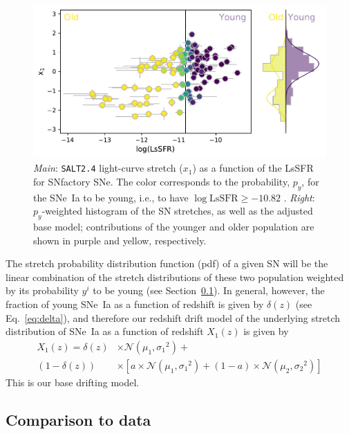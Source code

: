 \documentclass[]{aa}
\begin{document}
\begin{figure}
    \centering
    \includegraphics[width=0.8\linewidth]{Article_figures/model_base_hist.pdf}
    \caption{\textit{Main}: \textsc{\texttt{SALT2.4}} light-curve stretch
        ($x_1$) as a function of the LsSFR for SNfactory SNe. The color
        corresponds to the probability, $p_y$, for the SNe~Ia to be young, i.e.,
        to have $\log\mathrm{LsSFR} \geq -10.82$ \citep[see][]{rigault2020}.
    \textit{Right}: $p_y$-weighted histogram of the SN stretches, as well as the
adjusted base model; contributions of the younger and older population are shown
in purple and yellow, respectively.}
    \label{fig:stretchlssfr}
\end{figure}

The stretch probability distribution function (pdf) of a given SN will be the
linear combination of the stretch distributions of these two population weighted
by its probability $y^i$ to be young (see Section~\ref{sec:basemodelapplied}).
In general, however, the fraction of young SNe~Ia as a function of redshift is
given by $\delta(z)$ (see Eq.~\ref{eq:delta}), and therefore our redshift drift
model of the underlying stretch distribution of SNe~Ia as a function of redshift
$X_1(z)$ is given by
\begin{align}\label{eq:stretchz}
    X_1(z) = \delta(z)&\times \mathcal{N}(\mu_1,\sigma_1{}^2) + \nonumber \\
    (1-\delta(z))&\times \left[ a\times\mathcal{N}(\mu_1,\sigma_1{}^2) +
    (1-a)\times\mathcal{N}(\mu_2,\sigma_2{}^2) \right]
\end{align}
This is our base drifting model.

\subsection{Comparison to data}\label{sec:basemodelapplied}
\end{document}
